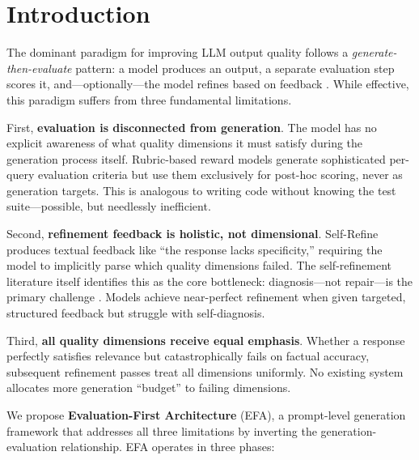 \documentclass[11pt]{article}
\newcommand{\efa}{\textsc{EFA}}  %
\begin{document}
\section{Introduction}

The dominant paradigm for improving LLM output quality follows a \emph{generate-then-evaluate} pattern: a model produces an output, a separate evaluation step scores it, and---optionally---the model refines based on feedback \citep{madaan2023selfrefine, shinn2023reflexion, gou2024critic}. While effective, this paradigm suffers from three fundamental limitations.

First, \textbf{evaluation is disconnected from generation}. The model has no explicit awareness of what quality dimensions it must satisfy during the generation process itself. Rubric-based reward models \citep{li2025openrubrics, zhang2025carmo} generate sophisticated per-query evaluation criteria but use them exclusively for post-hoc scoring, never as generation targets. This is analogous to writing code without knowing the test suite---possible, but needlessly inefficient.

Second, \textbf{refinement feedback is holistic, not dimensional}. Self-Refine \citep{madaan2023selfrefine} produces textual feedback like ``the response lacks specificity,'' requiring the model to implicitly parse which quality dimensions failed. The self-refinement literature itself identifies this as the core bottleneck: diagnosis---not repair---is the primary challenge \citep{lee2025refinebench}. Models achieve near-perfect refinement when given targeted, structured feedback but struggle with self-diagnosis.

Third, \textbf{all quality dimensions receive equal emphasis}. Whether a response perfectly satisfies relevance but catastrophically fails on factual accuracy, subsequent refinement passes treat all dimensions uniformly. No existing system allocates more generation ``budget'' to failing dimensions.

We propose \textbf{Evaluation-First Architecture} (\efa{}), a prompt-level generation framework that addresses all three limitations by inverting the generation-evaluation relationship. \efa{} operates in three phases:
\end{document}
